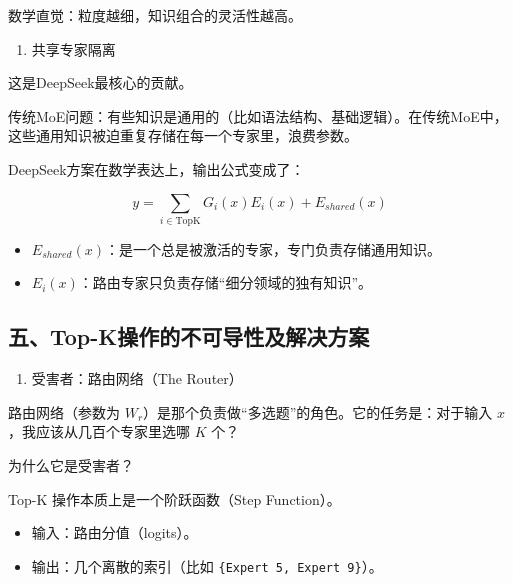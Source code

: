 数学直觉：粒度越细，知识组合的灵活性越高。

\begin{enumerate}
\def\labelenumi{\arabic{enumi}.}
\setcounter{enumi}{1}
\tightlist
\item
  共享专家隔离
\end{enumerate}

这是DeepSeek最核心的贡献。

传统MoE问题：有些知识是通用的（比如语法结构、基础逻辑）。在传统MoE中，这些通用知识被迫重复存储在每一个专家里，浪费参数。

DeepSeek方案在数学表达上，输出公式变成了：

\[
y=\sum_{i\in \mathrm{TopK}}G_i(x)E_i(x)+E_{shared}(x)
\]

\begin{itemize}
\tightlist
\item
  \(E_{shared}(x)\)：是一个总是被激活的专家，专门负责存储通用知识。
\item
  \(E_i(x)\)：路由专家只负责存储``细分领域的独有知识''。
\end{itemize}

\hypertarget{ux4e94top-kux64cdux4f5cux7684ux4e0dux53efux5bfcux6027ux53caux89e3ux51b3ux65b9ux6848}{%
\subsection{五、Top-K操作的不可导性及解决方案}\label{ux4e94top-kux64cdux4f5cux7684ux4e0dux53efux5bfcux6027ux53caux89e3ux51b3ux65b9ux6848}}

\begin{enumerate}
\def\labelenumi{\arabic{enumi}.}
\tightlist
\item
  受害者：路由网络（The Router）
\end{enumerate}

路由网络（参数为 \(W_r\)）是那个负责做``多选题''的角色。它的任务是：对于输入 \(x\)，我应该从几百个专家里选哪 \(K\) 个？

为什么它是受害者？

Top-K 操作本质上是一个阶跃函数（Step Function）。

\begin{itemize}
\tightlist
\item
  输入：路由分值（logits）。
\item
  输出：几个离散的索引（比如 \texttt{\{Expert\ 5,\ Expert\ 9\}}）。
\end{itemize}

